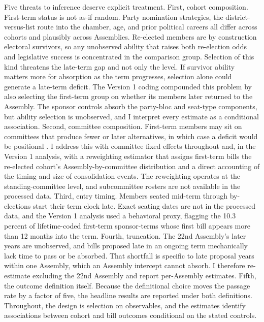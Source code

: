 \documentclass[11pt]{article}
\begin{document}
Five threats to inference deserve explicit treatment. First, cohort composition. First-term status is not as-if random. Party nomination strategies, the district-versus-list route into the chamber, age, and prior political careers all differ across cohorts and plausibly across Assemblies. Re-elected members are by construction electoral survivors, so any unobserved ability that raises both re-election odds and legislative success is concentrated in the comparison group. Selection of this kind threatens the late-term gap and not only the level. If survivor ability matters more for absorption as the term progresses, selection alone could generate a late-term deficit. The Version 1 coding compounded this problem by also selecting the first-term group on whether its members later returned to the Assembly. The sponsor controls absorb the party-bloc and seat-type components, but ability selection is unobserved, and I interpret every estimate as a conditional association. Second, committee composition. First-term members may sit on committees that produce fewer or later alternatives, in which case a deficit would be positional \citep{krutz2005}. I address this with committee fixed effects throughout and, in the Version 1 analysis, with a reweighting estimator that assigns first-term bills the re-elected cohort's Assembly-by-committee distribution and a direct accounting of the timing and size of consolidation events. The reweighting operates at the standing-committee level, and subcommittee rosters are not available in the processed data. Third, entry timing. Members seated mid-term through by-elections start their term clock late. Exact seating dates are not in the processed data, and the Version 1 analysis used a behavioral proxy, flagging the 10.3 percent of lifetime-coded first-term sponsor-terms whose first bill appears more than 12 months into the term. Fourth, truncation. The 22nd Assembly's later years are unobserved, and bills proposed late in an ongoing term mechanically lack time to pass or be absorbed. That shortfall is specific to late proposal years within one Assembly, which an Assembly intercept cannot absorb. I therefore re-estimate excluding the 22nd Assembly and report per-Assembly estimates. Fifth, the outcome definition itself. Because the definitional choice moves the passage rate by a factor of five, the headline results are reported under both definitions. Throughout, the design is selection on observables, and the estimates identify associations between cohort and bill outcomes conditional on the stated controls.
\end{document}
